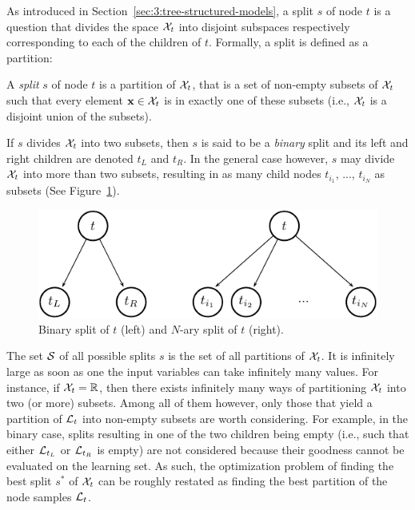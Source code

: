 As introduced in Section~\ref{sec:3:tree-structured-models}, a
split $s$ of node $t$ is  a question that divides the space ${\cal X}_t$ into
disjoint subspaces respectively  corresponding to each of the children of $t$.
Formally, a split is defined as a partition:

\begin{definition}
A \emph{split} $s$ of node $t$ is a partition of ${\cal X}_t$, that is a set of
non-empty subsets of ${\cal X}_t$ such that every element $\mathbf{x} \in {\cal X}_t$
is in exactly one of these subsets (i.e., ${\cal X}_t$ is a disjoint union
of the subsets).
\end{definition}

If $s$ divides ${\cal X}_t$ into two subsets, then $s$ is said to be a
\textit{binary} split and its left and right children are denoted $t_L$ and
$t_R$. In the general case however, $s$ may divide ${\cal X}_t$ into more than
two subsets, resulting in as many child nodes $t_{i_1}$, ..., $t_{i_N}$ as
subsets (See Figure~\ref{fig:3:splits}).

\begin{figure}
    \centering
    \includegraphics[scale=1.0]{figures/ch3_splits.pdf}
    \caption{Binary split of $t$ (left) and $N$-ary split of $t$ (right).}
    \label{fig:3:splits}
\end{figure}

The set ${\cal S}$ of all possible splits $s$ is the set of all partitions of
${\cal X}_t$. It is infinitely large as soon as one the input variables can
take infinitely many values. For instance, if ${\cal X}_t = \mathbb{R}$, then
there exists infinitely many ways of partitioning ${\cal X}_t$ into two (or
more) subsets. Among all of them however, only those that yield a partition of
${\cal L}_t$ into non-empty subsets are worth considering. For example, in the
binary case, splits resulting in one of the two children being empty (i.e., such
that either ${\cal L}_{t_L}$ or ${\cal L}_{t_R}$ is empty) are not considered
because their goodness cannot be evaluated on the learning set. As such, the
optimization problem of finding the best split $s^*$ of ${\cal X}_t$ can be
roughly restated as finding the best partition of the node samples ${\cal L}_t$.

